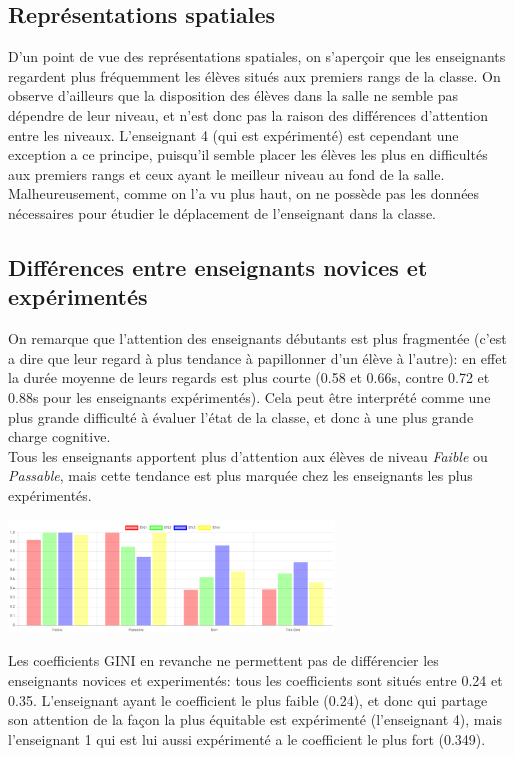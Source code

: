 \documentclass{article}
\begin{document}
\subsection{Représentations spatiales}
D'un point de vue des représentations spatiales, on s'aperçoir que les enseignants regardent plus fréquemment les élèves situés aux premiers rangs de la classe. On observe d'ailleurs que la disposition des élèves dans la salle ne semble pas dépendre de leur niveau, et n'est donc pas la raison des différences d'attention entre les niveaux. L'enseignant 4 (qui est expérimenté) est cependant une exception a ce principe, puisqu'il semble placer les élèves les plus en difficultés aux premiers rangs et ceux ayant le meilleur niveau au fond de la salle.\\
Malheureusement, comme on l'a vu plus haut, on ne possède pas les données nécessaires pour étudier le déplacement de l'enseignant dans la classe.

\subsection{Différences entre enseignants novices et expérimentés}
On remarque que l'attention des enseignants débutants est plus fragmentée (c'est a dire que leur regard à plus tendance à papillonner d'un élève à l'autre): en effet la durée moyenne de leurs regards est plus courte (0.58 et 0.66s, contre 0.72 et 0.88s pour les enseignants expérimentés). Cela peut être interprété comme une plus grande difficulté à évaluer l'état de la classe, et donc à une plus grande charge cognitive.\\
Tous les enseignants apportent plus d'attention aux élèves de niveau \textit{Faible} ou \textit{Passable}, mais cette tendance est plus marquée chez les enseignants les plus expérimentés.\\
\begin{center}
    \includegraphics[height=3cm]{niv_francais.png}
\end{center}
Les coefficients GINI en revanche ne permettent pas de différencier les enseignants novices et experimentés: tous les coefficients sont situés entre 0.24 et 0.35. L'enseignant ayant le coefficient le plus faible (0.24), et donc qui partage son attention de la façon la plus équitable est expérimenté (l'enseignant 4), mais l'enseignant 1 qui est lui aussi expérimenté a le coefficient le plus fort (0.349).\\
\end{document}

